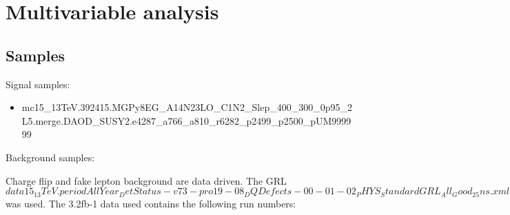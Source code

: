 \section{Multivariable analysis}

\subsection{Samples}
Signal samples:
\begin{itemize}
\item mc15\_13TeV.392415.MGPy8EG\_A14N23LO\_C1N2\_Slep\_400\_300\_0p95\_2L5.merge.DAOD\_SUSY2.e4287\_a766\_a810\_r6282\_p2499\_p2500\_pUM999999
\end{itemize}

Background samples:

Charge flip and fake lepton background are data driven. The GRL $data15_13TeV.periodAllYear_DetStatus-v73-pro19-08_DQDefects-00-01-02_PHYS_StandardGRL_All_Good_25ns.xml$ was used. The 3.2fb-1 data used contains the following run numbers:
